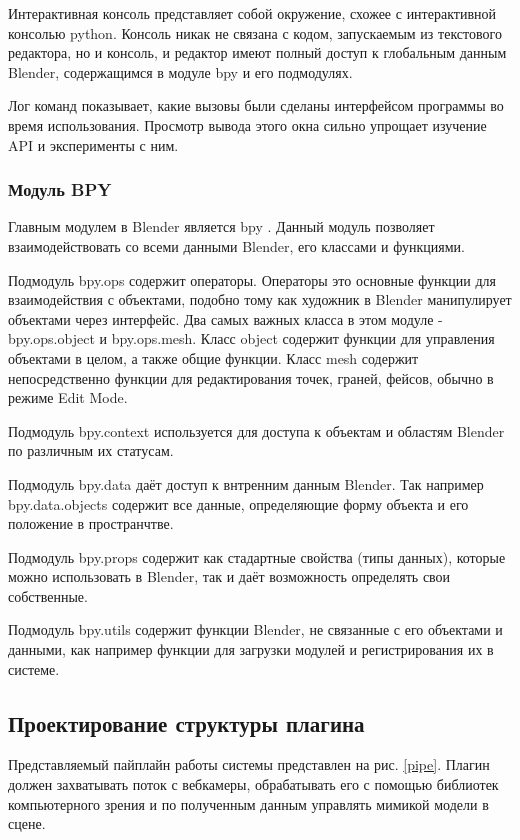 Интерактивная консоль представляет собой окружение, схожее с интерактивной консолью python. Консоль никак не связана с кодом, запускаемым из текстового редактора, но и консоль, и редактор имеют полный доступ к глобальным данным Blender, содержащимся в модуле bpy и его подмодулях.

Лог команд показывает, какие вызовы были сделаны интерфейсом программы во время использования. Просмотр вывода этого окна сильно упрощает изучение API и эксперименты с ним.

\subsubsection{Модуль BPY}

Главным модулем в Blender является bpy \cite{blenderapiref}. Данный модуль позволяет взаимодействовать со всеми данными Blender, его классами и функциями. 

Подмодуль bpy.ops содержит операторы. Операторы это основные функции для взаимодействия с объектами, подобно тому как художник в Blender манипулирует объектами через интерфейс.
Два самых важных класса в этом модуле -  bpy.ops.object и bpy.ops.mesh. Класс object содержит функции для управления объектами в целом, а также общие функции. Класс mesh содержит непосредственно функции для редактирования точек, граней, фейсов, обычно в режиме Edit Mode.

Подмодуль bpy.context используется для доступа к объектам и областям Blender по различным их статусам.

Подмодуль bpy.data даёт доступ к внтренним данным Blender. Так например  bpy.data.objects содержит все данные, определяющие форму объекта и его положение в пространчтве.

Подмодуль bpy.props содержит как стадартные свойства (типы данных), которые можно использовать в Blender, так и даёт возможность определять свои собственные.

Подмодуль bpy.utils содержит функции Blender, не связанные с его объектами и данными, как например функции для загрузки модулей и регистрирования их в системе.

\subsection{Проектирование структуры плагина}

Представляемый пайплайн работы системы представлен на рис. \ref{pipe}. Плагин должен захватывать поток с вебкамеры, обрабатывать его с помощью библиотек компьютерного зрения и по полученным данным управлять мимикой модели в сцене.

